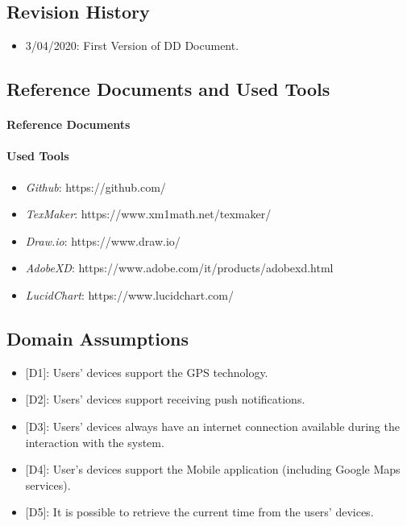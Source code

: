 \documentclass[11pt]{article} %
\begin{document}
\subsection{Revision History}
\begin{itemize}
\item 3/04/2020: First Version of DD Document.
\end{itemize}

\subsection{Reference Documents and Used Tools}
\paragraph{Reference Documents}


\paragraph{Used Tools}
\begin{itemize}
\item \textit{Github}: https://github.com/
\item \textit{TexMaker}: https://www.xm1math.net/texmaker/
\item \textit{Draw.io}: https://www.draw.io/
\item \textit{AdobeXD}: https://www.adobe.com/it/products/adobexd.html
\item \textit{LucidChart}: https://www.lucidchart.com/
\end{itemize}

\subsection{Domain Assumptions}
\begin{itemize}
  \item {}[D1]: Users' devices support the GPS technology.
  \item {}[D2]: Users' devices support receiving push notifications.
  \item {}[D3]: Users' devices always have an internet connection available during the interaction with the system.
  \item {}[D4]: User's devices support the Mobile application (including Google Maps services).
  \item {}[D5]: It is possible to retrieve the current time from the users' devices.
\end{itemize}
\end{document}
